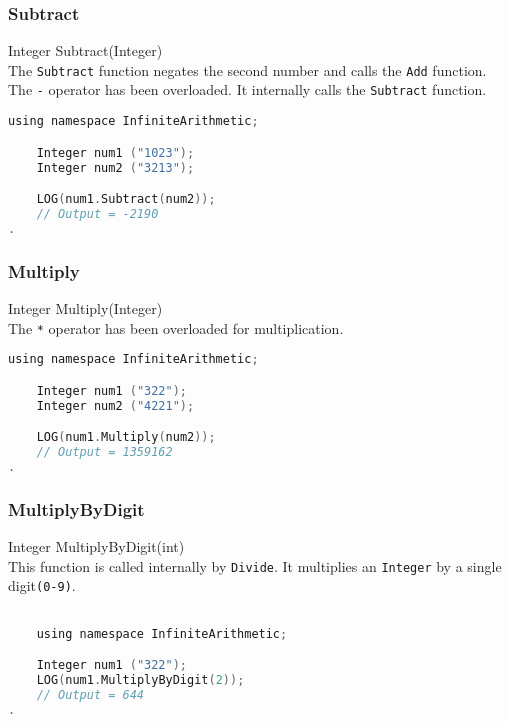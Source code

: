\subsubsection{Subtract}
{\ttfamily \large Integer Subtract(Integer)} \\[2mm]
The \verb|Subtract| function negates the second number and calls the \verb|Add| function. \\
The \verb|-| operator has been overloaded. It internally calls the \verb|Subtract| function.
\vspace*{1em}
\begin{lstlisting}[language = C]	
	using namespace InfiniteArithmetic;

	Integer num1 ("1023");
	Integer num2 ("3213");

	LOG(num1.Subtract(num2));
	// Output = -2190
.
\end{lstlisting}
\vspace*{1em}


\subsubsection{Multiply}
{\ttfamily \large Integer Multiply(Integer)} \\[2mm]
The \verb|*| operator has been overloaded for multiplication.
\vspace*{1em}
\begin{lstlisting}[language = C]	
	using namespace InfiniteArithmetic;

	Integer num1 ("322");
	Integer num2 ("4221");

	LOG(num1.Multiply(num2));
	// Output = 1359162
.
\end{lstlisting}
\vspace*{1em}


\subsubsection{MultiplyByDigit}
{\ttfamily \large Integer MultiplyByDigit(int)} \\[2mm]
This function is called internally by \verb|Divide|. It multiplies an \verb|Integer| by a single digit\verb|(0-9)|.
\vspace*{0em}
\begin{lstlisting}[language = C]

	using namespace InfiniteArithmetic;

	Integer num1 ("322");
	LOG(num1.MultiplyByDigit(2));
	// Output = 644
.
\end{lstlisting}


